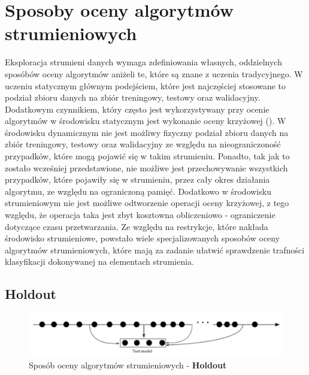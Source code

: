 \section{Sposoby oceny algorytmów strumieniowych}

\noindent Eksploracja strumieni danych wymaga zdefiniowania własnych, oddzielnych sposóbów oceny algorytmów aniżeli te, które są znane z uczenia tradycyjnego. W uczeniu statycznym głównym podejściem, które jest najczęściej stosowane to podział zbioru danych na zbiór treningowy, testowy oraz walidacyjny. Dodatkowym czynnikiem, który często jest wykorzystywany przy ocenie algorytmów w środowisku statycznym jest wykonanie oceny krzyżowej (). W środowisku dynamicznym nie jest możliwy fizyczny podział zbioru danych na zbiór treningowy, testowy oraz walidacyjny ze względu na nieograniczoność przypadków, które mogą pojawić się w takim strumieniu. Ponadto, tak jak to zostało wcześniej przedstawione, nie możliwe jest przechowywanie wszystkich przypadków, które pojawiły się w strumieniu, przez cały okres działania algorytmu, ze względu na ograniczoną pamięć. Dodatkowo w środowisku strumieniowym nie jest możliwe odtworzenie operacji oceny krzyżowej, z tego względu, że operacja taka jest zbyt kosztowna obliczeniowo - ograniczenie dotyczące czasu przetwarzania. Ze względu na restrykcje, które nakłada środowisko strumieniowe, powstało wiele specjalizowanych sposobów oceny algorytmów strumieniowych, które mają za zadanie ułatwić sprawdzenie trafności klasyfikacji dokonywanej na elementach strumienia.

\newpage

\subsection{Holdout}

\begin{figure}[h] 
    \centering
    \includegraphics[width=15cm]{figures/holdout.JPG}
    \caption{Sposób oceny algorytmów strumieniowych - \textbf{Holdout} \cite{Prezentacja:Strumienie}}\label{Figure:Holdout}
\end{figure}

